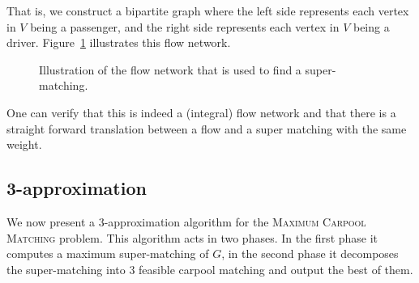 \documentclass[draft]{article}
\def\CARPOOL{Maximum Carpool Ma\-tching}
\begin{document}
That is, 
we construct a bipartite graph where the left side represents each vertex 
in $V$ being a passenger,
and the right side represents each vertex in $V$ being a driver.
Figure~\ref{fig:cm-flow} illustrates this flow network.
%
\begin{figure}
\centering
{}
\caption{
\label{fig:cm-flow}
Illustration of the flow network that is used to find a super-matching.
}
\end{figure}
%
One can verify that this is indeed a (integral) flow network and that there is a
straight forward translation between a flow and a super matching with the same weight.
	\subsection{3-approximation}
We now present a 3-approximation algorithm for the \textsc{\CARPOOL{}} problem.
This algorithm acts in two phases.
In the first phase it computes a maximum super-matching of $G$, 
in the second phase it decomposes the super-matching into 3 feasible
carpool matching and output the best of them.
\end{document}
